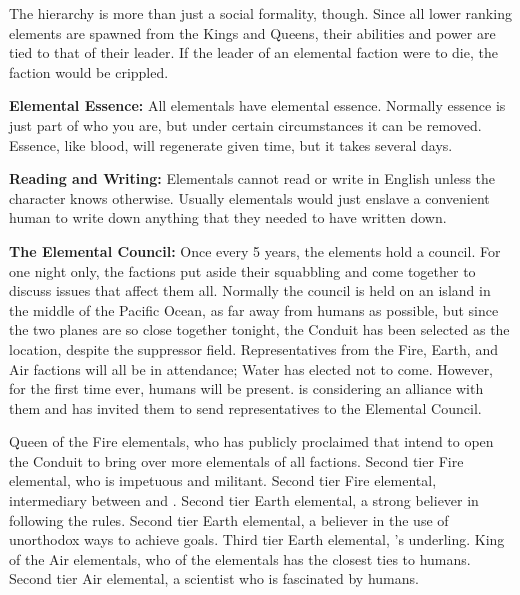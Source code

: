 \documentclass[blue]{elementals}
\begin{document}
The hierarchy is more than just a social formality, though. Since all lower ranking elements are spawned from the Kings and Queens, their abilities and power are tied to that of their leader. If the leader of an elemental faction were to die, the faction would be crippled.


{\bf Elemental Essence:}
All elementals have elemental essence. Normally essence is just part of who you are, but under certain circumstances it can be removed. Essence, like blood, will regenerate given time, but it takes several days.

{\bf Reading and Writing:}
Elementals cannot read or write in English unless the character knows otherwise. Usually elementals would just enslave a convenient human to write down anything that they needed to have written down.

{\bf The Elemental Council:}
Once every 5 years, the elements hold a council. For one night only, the factions put aside their squabbling and come together to discuss issues that affect them all. Normally the council is held on an island in the middle of the Pacific Ocean, as far away from humans as possible, but since the two planes are so close together tonight, the Conduit has been selected as the location, despite the suppressor field.  Representatives from the Fire, Earth, and Air factions will all be in attendance; Water has elected not to come.  However, for the first time ever, humans will be present.  \cKing{} is considering an alliance with them and has invited them to send representatives to the Elemental Council.

\begin{members}
  \member{\cQueen{}} Queen of the Fire elementals, who has publicly proclaimed that \cQueen{\they} intend to open the Conduit to bring over more elementals of all factions.
  \member{\cPyro{}} Second tier Fire elemental, who is impetuous and militant.
  \member{\cJuliet{}} Second tier Fire elemental, intermediary between \cQueen{} and \cKing{}.
  \member{\cLoyal{}} Second tier Earth elemental, a strong believer in following the rules.
  \member{\cRogue{}} Second tier Earth elemental, a believer in the use of unorthodox ways to achieve goals.
  \member{\cMinion{}} Third tier Earth elemental, \cLoyal{}'s underling.
  \member{\cKing{}} King of the Air elementals, who of the elementals has the closest ties to humans.
  \member{\cNaturalist{}} Second tier Air elemental, a scientist who is fascinated by humans.
\end{members}
\end{document}
